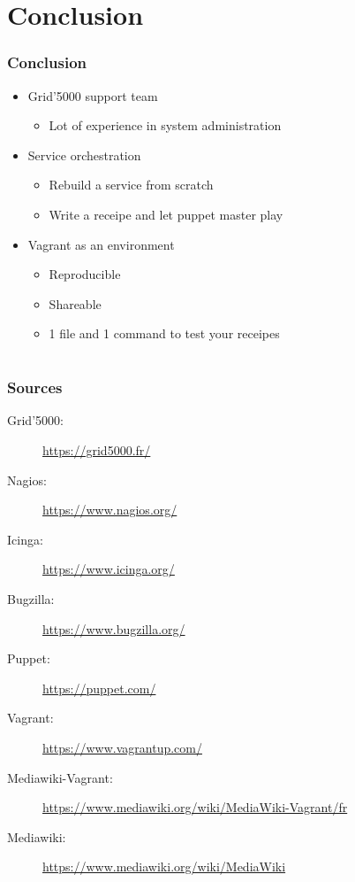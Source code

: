 \documentclass[11pt,compress]{beamer}
\begin{document}
\section{Conclusion}
\begin{frame}
\frametitle{Conclusion}
\begin{itemize}
\item Grid'5000 support team
\begin{itemize}
\item Lot of experience in system administration
\end{itemize}
\item Service orchestration
\begin{itemize}
\item Rebuild a service from scratch
\item Write a receipe and let puppet master play
\end{itemize}
\item Vagrant as an environment
\begin{itemize}
\item Reproducible
\item Shareable
\item 1 file and 1 command to test your receipes
\end{itemize}
\end{itemize}

\end{frame}

\section*{}
\begin{frame}
\frametitle{Sources}
\begin{scriptsize}
\begin{description}
\item[Grid'5000:]\url{https://grid5000.fr/}
\item[Nagios:]\url{https://www.nagios.org/}
\item[Icinga:]\url{https://www.icinga.org/}
\item[Bugzilla:]\url{https://www.bugzilla.org/}
\item[Puppet:]\url{https://puppet.com/}
\item[Vagrant:]\url{https://www.vagrantup.com/}
\item[Mediawiki-Vagrant:]\url{https://www.mediawiki.org/wiki/MediaWiki-Vagrant/fr}
\item[Mediawiki:]\url{https://www.mediawiki.org/wiki/MediaWiki}
\end{description}
\end{scriptsize}
\end{frame}
\end{document}
